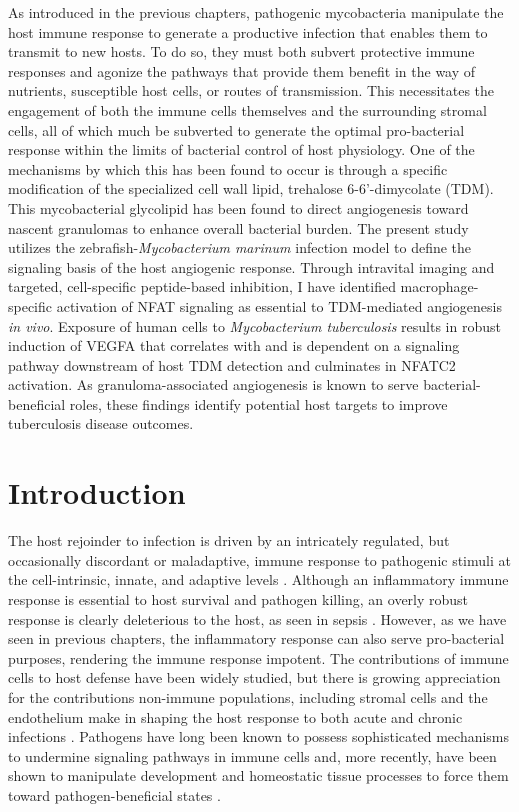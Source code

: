As introduced in the previous chapters, pathogenic mycobacteria manipulate the host immune response to generate a productive infection that enables them to transmit to new hosts. To do so, they must both subvert protective immune responses and agonize the pathways that provide them benefit in the way of nutrients, susceptible host cells, or routes of transmission. This necessitates the engagement of both the immune cells themselves and the surrounding stromal cells, all of which much be subverted to generate the optimal pro\hyp{}bacterial response within the limits of bacterial control of host physiology. One of the mechanisms by which this has been found to occur is through a specific modification of the specialized cell wall lipid, trehalose 6\hyp{}6'\hyp{}dimycolate (TDM). This mycobacterial glycolipid has been found to direct angiogenesis toward nascent granulomas to enhance overall bacterial burden. The present study utilizes the zebrafish\hyp{}\textit{Mycobacterium marinum} infection model to define the signaling basis of the host angiogenic response. Through intravital imaging and targeted, cell\hyp{}specific peptide\hyp{}based inhibition, I have identified macrophage\hyp{}specific activation of NFAT signaling as essential to TDM\hyp{}mediated angiogenesis \textit{in vivo}. Exposure of human cells to \textit{Mycobacterium tuberculosis} results in robust induction of VEGFA that correlates with and is dependent on a signaling pathway downstream of host TDM detection and culminates in NFATC2 activation. As granuloma\hyp{}associated angiogenesis is known to serve bacterial\hyp{}beneficial roles, these findings identify potential host targets to improve tuberculosis disease outcomes.

\section{Introduction}\label{pap:intro}

The host rejoinder to infection is driven by an intricately regulated, but occasionally discordant or maladaptive, immune response to pathogenic stimuli at the cell\hyp{}intrinsic, innate, and adaptive levels \citep{MacMicking2004, Finlay2006, Iwasaki2010, MacMicking2012, Kim2012, Haldar2015, Wilburn2022}. Although an inflammatory immune response is essential to host survival and pathogen killing, an overly robust response is clearly deleterious to the host, as seen in sepsis \citep{Casadevall2003, Finethy2020}. However, as we have seen in previous chapters, the inflammatory response can also serve pro\hyp{}bacterial purposes, rendering the immune response impotent. The contributions of immune cells to host defense have been widely studied, but there is growing appreciation for the contributions non\hyp{}immune populations, including stromal cells and the endothelium \citep{Honan2021, Worrell2021, Honan2021, Amersfoort2022} make in shaping the host response to both acute and chronic infections \citep{Mueller2009, Randow2013, Krishnamurty2020}. Pathogens have long been known to possess sophisticated mechanisms to undermine signaling pathways in immune cells and, more recently, have been shown to manipulate development and homeostatic tissue processes to force them toward pathogen\hyp{}beneficial states \citep{Menzies1998, Guichard2013}.

